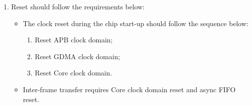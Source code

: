 \documentclass[main\_\_EN.tex]{subfiles}
\begin{document}
\begin{enumerate}
    Here are the specific operation steps for the RX unit:
    \begin{itemize}
        \item Clear \hyperref[fielddesc:HPSYSCLKRSTPARLIORXCLKEN]{HP\_SYS\_CLKRST\_PARLIO\_RX\_CLK\_EN} to turn off RX Core clock domain;
        \item Write 1 to \hyperref[fielddesc:PARLIORXSTART]{PARL\_IO\_RX\_START};
        \item Set \hyperref[fielddesc:HPSYSCLKRSTPARLIORXCLKEN]{HP\_SYS\_CLKRST\_PARLIO\_RX\_CLK\_EN} to turn on RX Core clock domain;
        \item Operate the external device to start sending data;
        \item Clear \hyperref[fielddesc:HPSYSCLKRSTPARLIORXCLKEN]{HP\_SYS\_CLKRST\_PARLIO\_RX\_CLK\_EN} to turn off RX Core clock domain;
        \item Write 0 to \hyperref[fielddesc:PARLIORXSTART]{PARL\_IO\_RX\_START}.
    \end{itemize}
    Here are the specific operation steps for the TX unit:
    \begin{itemize}
        \item Clear \hyperref[fielddesc:HPSYSCLKRSTPARLIOTXCLKEN]{HP\_SYS\_CLKRST\_PARLIO\_TX\_CLK\_EN} to turn off TX Core clock domain;
        \item Write 1 to \hyperref[fielddesc:PARLIOTXSTART]{PARL\_IO\_TX\_START};
        \item Set \hyperref[fielddesc:HPSYSCLKRSTPARLIOTXCLKEN]{HP\_SYS\_CLKRST\_PARLIO\_TX\_CLK\_EN} to turn on TX Core clock domain;
        \item Operate the external device to start receiving data;
        \item Clear \hyperref[fielddesc:HPSYSCLKRSTPARLIOTXCLKEN]{HP\_SYS\_CLKRST\_PARLIO\_TX\_CLK\_EN} to turn off TX Core clock domain;
        \item Write 0 to \hyperref[fielddesc:PARLIOTXSTART]{PARL\_IO\_TX\_START}.
    \end{itemize}

    \item Reset should follow the requirements below:
    \begin{itemize}
        \item The clock reset during the chip start-up should follow the sequence below:
        \begin{enumerate}
            \item Reset APB clock domain;
            \item Reset GDMA clock domain;
            \item Reset Core clock domain.
        \end{enumerate}
        \item Inter-frame transfer requires Core clock domain reset and async FIFO reset.
    \end{itemize}
\end{enumerate}
\end{document}
